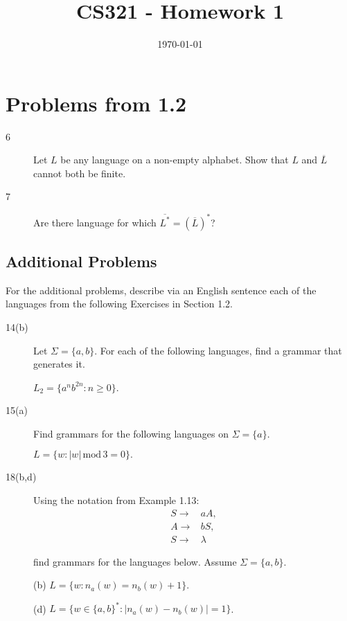 \documentclass[12pt]{article}
\title{CS321 - Homework 1}
\date{\today}
\begin{document}
\maketitle

%
%
%
\section*{Problems from 1.2}
\begin{description}
    \item[6] Let $L$ be any language on a non-empty alphabet. Show that $L$ and
          $\overline{L}$ cannot both be finite.

    \item[7] Are there language for which $\overline{L^*} = (\overline{L})^*$?
\end{description}

\subsection*{Additional Problems}
For the additional problems, describe via an English sentence each of
the languages from the following Exercises in Section 1.2.

\begin{description}
    \item[14(b)] Let $\Sigma = \{a,b\}$. For each of the following
                 languages, find a grammar that generates it.

                 $L_2 = \{a^n b^{2n} : n \ge 0\}$.
\end{description}

\begin{description}
    \item[15(a)] Find grammars for the following languages on $\Sigma = \{a\}$.

                 $L = \{w : |w|\, \mathrm{mod}\, 3 = 0\}.$
\end{description}

\begin{description}
    \item[18(b,d)]
        Using the notation from Example 1.13:
        \begin{eqnarray*}
          S \to& aA, \\
          A \to& bS,\\
          S \to& \lambda
        \end{eqnarray*}

        find grammars for the languages below. Assume $\Sigma = \{a,b\}$.

        (b) $L = \{w : n_a (w) = n_b (w) + 1\}$.

        (d) $L = \{w \in \{a, b\}^* : |n_a(w) - n_b(w)| = 1\}$.
\end{description}
\end{document}
